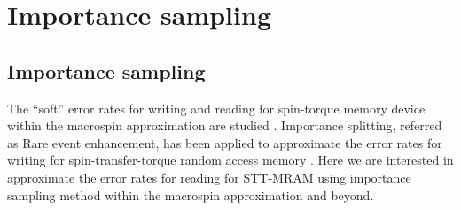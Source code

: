 \documentclass[journal,transmag]{IEEEtran}
\begin{document}




\section{Importance sampling}
\subsection{Importance sampling}
The ``soft'' error rates for writing and reading for spin-torque memory device within the macrospin approximation are studied \cite{6242414}. Importance splitting, referred as Rare event enhancement, has been applied to approximate the  error rates for writing for spin-transfer-torque random access memory \cite{7491203}. Here we are interested in approximate the error rates for reading for STT-MRAM using importance sampling method within the macrospin approximation and beyond. 
\end{document}

